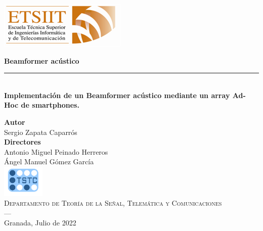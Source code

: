 \begin{titlepage}
 
 
\setlength{\centeroffset}{-0.5\oddsidemargin}
\addtolength{\centeroffset}{0.5\evensidemargin}
\thispagestyle{empty}

\noindent\hspace*{\centeroffset}\begin{minipage}{\textwidth}

\centering



 \vspace{3.3cm}

\includegraphics{imagenes/etsiit_logo.png} 
 \vspace{0.5cm}


{\Huge\bfseries Beamformer acústico\\
}
\noindent\rule[-1ex]{\textwidth}{3pt}\\[3.5ex]
{\large\bfseries Implementación de un Beamformer acústico mediante un array Ad-Hoc de smartphones.\\[4cm]}
\end{minipage}

\vspace{2.5cm}
\noindent\hspace*{\centeroffset}\begin{minipage}{\textwidth}
\centering

\textbf{Autor}\\ {Sergio Zapata Caparrós}\\[2.5ex]
\textbf{Directores}\\
{Antonio Miguel Peinado Herreros\\
Ángel Manuel Gómez García}\\[2cm]
\includegraphics[width=0.15\textwidth]{imagenes/tstc.png}\\[0.1cm]
\textsc{Departamento de Teoría de la Señal, Telemática y Comunicaciones}\\
\textsc{---}\\
Granada, Julio de 2022
\end{minipage}

 
\end{titlepage}


